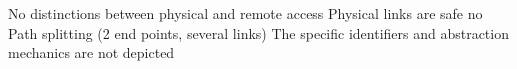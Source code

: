 No distinctions between physical and remote access
Physical links are safe
no Path splitting (2 end points, several links)
The specific identifiers and abstraction mechanics are not depicted